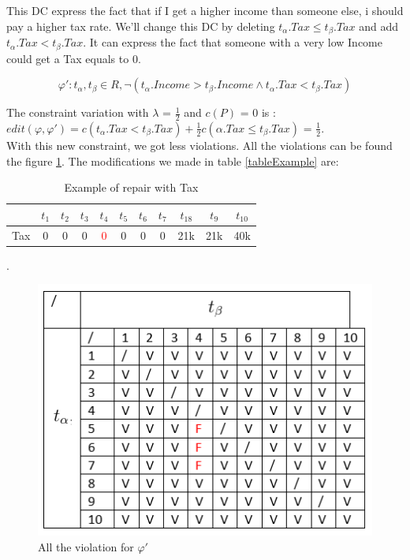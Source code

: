 \documentclass[letterpaper, 12pt]{report}
\theoremstyle{definition}
\begin{document}
This DC express the fact that if I get a higher income than someone else, i should pay a higher tax rate. We'll change this DC by deleting $t_\alpha.Tax \leq t_\beta.Tax$ and add $t_\alpha.Tax < t_\beta.Tax$. It can express the fact that someone with a very low Income could get a Tax equals to 0.

$$ \varphi ' : t_\alpha,t_\beta \in R, \neg(t_\alpha.Income > t_\beta.Income \wedge t_\alpha.Tax < t_\beta.Tax)$$

The constraint variation with $\lambda$ = $\frac{1}{2}$ and $c(P)$ = 0 is : $edit(\varphi, \varphi') = c(t_\alpha.Tax < t_\beta.Tax) + \frac{1}{2} c(\alpha.Tax \leq t_\beta.Tax)$ = $\frac{1}{2}$. \\

With this new constraint, we got less violations. All the violations can be found the figure \ref{GoodTax}. The modifications we made in table \ref{tableExample} are:

\begin{table}[H]
	\centering
	\begin{tabular}{|c|c c c c c c c c c c|}
	\hline
	   & $t_1$ & $t_2$ & $t_3$ &$t_4$ &$t_5$ &$t_6$ &$t_7$ &$t_18$ &$t_9$ &$t_10$ \\
	\hline
	 Tax & 0 & 0 & 0 & \textcolor{red}{0} & 0 & 0 & 0 & 21k & 21k & 40k\\
	 \hline
	\end{tabular}
	\caption{\label{tableExample2} Example of repair with Tax}.
\end{table}


\begin{figure}
	\centering
	\includegraphics[scale=1]{img/TaxGood}
	\caption{\label{GoodTax} All the violation for $\varphi '$}
\end{figure}
\end{document}
